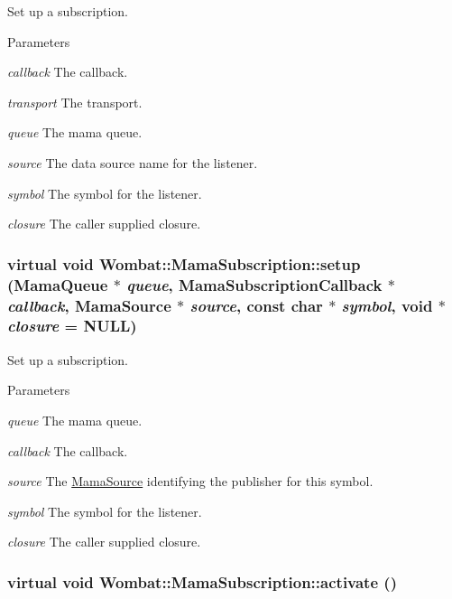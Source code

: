 Set up a subscription. 
\begin{DoxyParams}{Parameters}
\item[{\em callback}]The callback. \item[{\em transport}]The transport. \item[{\em queue}]The mama queue. \item[{\em source}]The data source name for the listener. \item[{\em symbol}]The symbol for the listener. \item[{\em closure}]The caller supplied closure. \end{DoxyParams}
\hypertarget{classWombat_1_1MamaSubscription_a944f05bd8717893b18eca077bcc3684c}{
\subsubsection[{setup}]{\setlength{\rightskip}{0pt plus 5cm}virtual void Wombat::MamaSubscription::setup ({\bf MamaQueue} $\ast$ {\em queue}, \/  {\bf MamaSubscriptionCallback} $\ast$ {\em callback}, \/  {\bf MamaSource} $\ast$ {\em source}, \/  const char $\ast$ {\em symbol}, \/  void $\ast$ {\em closure} = {\ttfamily NULL})}}
\label{classWombat_1_1MamaSubscription_a944f05bd8717893b18eca077bcc3684c}


Set up a subscription. 
\begin{DoxyParams}{Parameters}
\item[{\em queue}]The mama queue. \item[{\em callback}]The callback. \item[{\em source}]The \hyperlink{classWombat_1_1MamaSource}{MamaSource} identifying the publisher for this symbol. \item[{\em symbol}]The symbol for the listener. \item[{\em closure}]The caller supplied closure. \end{DoxyParams}
\hypertarget{classWombat_1_1MamaSubscription_abe7de53adbc4d0173692bae6073d985d}{
\subsubsection[{activate}]{\setlength{\rightskip}{0pt plus 5cm}virtual void Wombat::MamaSubscription::activate ()}}
\label{classWombat_1_1MamaSubscription_abe7de53adbc4d0173692bae6073d985d}


